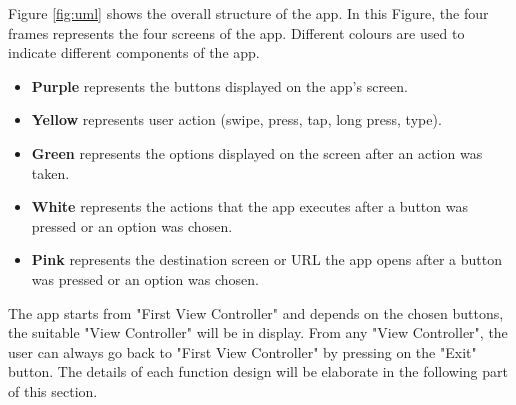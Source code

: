 Figure \ref{fig:uml} shows the overall structure of the app. In this Figure, the four frames represents the four screens of the app. Different colours are used to indicate different components of the app.
\begin{itemize}
\item \textbf{Purple} represents the buttons displayed on the app's screen.
\item \textbf{Yellow} represents user action (swipe, press, tap, long press, type).
\item \textbf{Green} represents the options displayed on the screen after an action was taken.
\item \textbf{White} represents the actions that the app executes after a button was pressed or an option was chosen.
\item \textbf{Pink} represents the destination screen or URL the app opens after a button was pressed or an option was chosen. 
\end{itemize}
The app starts from "First View Controller" and depends on the chosen buttons, the suitable "View Controller" will be in display. From any "View Controller", the user can always go back to "First View Controller" by pressing on the "Exit" button. The details of each function design will be elaborate in the following part of this section.

